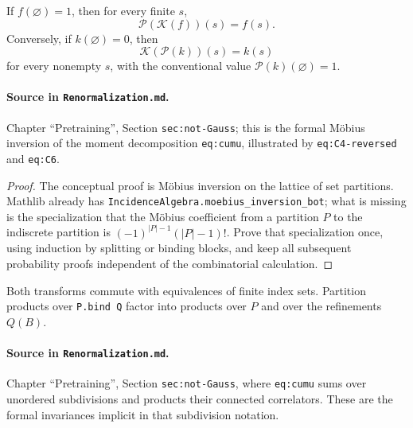 \begin{theorem}
\label{thm:renorm:partitionInversion}
If $f(\varnothing)=1$, then for every finite $s$,
\[
  \mathcal P(\mathcal K(f))(s)=f(s).
\]
Conversely, if $k(\varnothing)=0$, then
\[
  \mathcal K(\mathcal P(k))(s)=k(s)
\]
for every nonempty $s$, with the conventional value $\mathcal P(k)(\varnothing)=1$.

\paragraph{Source in \texttt{Renormalization.md}.}
Chapter ``Pretraining'', Section \texttt{sec:not-Gauss}; this is the formal M\"obius inversion of
the moment decomposition \texttt{eq:cumu}, illustrated by \texttt{eq:C4-reversed} and
\texttt{eq:C6}.
\end{theorem}

\begin{proof}
The conceptual proof is M\"obius inversion on the lattice of set partitions.  Mathlib already has
\texttt{IncidenceAlgebra.moebius\_inversion\_bot}; what is missing is the specialization that the
M\"obius coefficient from a partition $P$ to the indiscrete partition is
$(-1)^{|P|-1}(|P|-1)!$.  Prove that specialization once, using induction by splitting or binding
blocks, and keep all subsequent probability proofs independent of the combinatorial calculation.
\end{proof}

\begin{lemma}
\label{lem:renorm:partitionAPI}
Both transforms commute with equivalences of finite index sets.  Partition products over
\texttt{P.bind Q} factor into products over $P$ and over the refinements $Q(B)$.

\paragraph{Source in \texttt{Renormalization.md}.}
Chapter ``Pretraining'', Section \texttt{sec:not-Gauss}, where \texttt{eq:cumu} sums over unordered
subdivisions and products their connected correlators.  These are the formal invariances implicit
in that subdivision notation.
\end{lemma}

